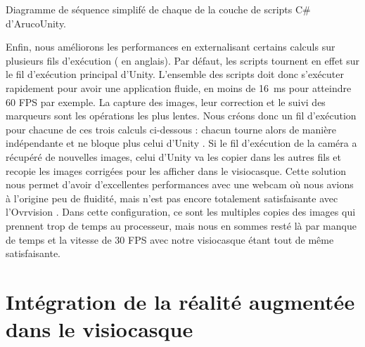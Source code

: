 {
}{Diagramme de séquence simplifé de chaque  de la couche de scripts C\# d'ArucoUnity.}

Enfin, nous améliorons les performances en externalisant certains calculs sur plusieurs fils d'exécution ( en anglais). Par défaut, les scripts tournent en effet sur le fil d'exécution principal d'Unity. L'ensemble des scripts doit donc s'exécuter rapidement pour avoir une application fluide, en moins de \SI{16}{\ms} pour atteindre 60 FPS par exemple. La capture des images, leur correction et le suivi des marqueurs sont les opérations les plus lentes. Nous créons donc un fil d'exécution pour chacune de ces trois calculs ci-dessous : chacun tourne alors de manière indépendante et ne bloque plus celui d'Unity . Si le fil d'exécution de la caméra a récupéré de nouvelles images, celui d'Unity va les copier dans les autres fils et recopie les images corrigées pour les afficher dans le visiocasque. Cette solution nous permet d'avoir d'excellentes performances avec une webcam où nous avions à l'origine peu de fluidité, mais n'est pas encore totalement satisfaisante avec l'Ovrvision . Dans cette configuration, ce sont les multiples copies des images qui prennent trop de temps au processeur, mais nous en sommes resté là par manque de temps et la vitesse de 30 FPS avec notre visiocasque étant tout de même satisfaisante.


\section{Intégration de la réalité augmentée dans le visiocasque}
\label{sec:ar_hmd}

